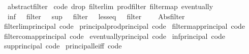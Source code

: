 \begin{isabellebody}
\isamarkupfalse%
\ {\isacharparenleft}{\kern0pt}\ abstract{\isacharunderscore}{\kern0pt}filter\isanewline
\isanewline
{}\isamarkupfalse%
\ {\isacharbrackleft}{\kern0pt}{\isacharbrackleft}{\kern0pt}code\ drop{\isacharcolon}{\kern0pt}\ filterlim\ prod{\isacharunderscore}{\kern0pt}filter\ filtermap\ eventually\isanewline
\ \ {\isachardoublequoteopen}inf\ {\isacharcolon}{\kern0pt}{\isacharcolon}{\kern0pt}\ {\isacharunderscore}{\kern0pt}\ filter\ {\isasymRightarrow}\ {\isacharunderscore}{\kern0pt}{\isachardoublequoteclose}\ {\isachardoublequoteopen}sup\ {\isacharcolon}{\kern0pt}{\isacharcolon}{\kern0pt}\ {\isacharunderscore}{\kern0pt}\ filter\ {\isasymRightarrow}\ {\isacharunderscore}{\kern0pt}{\isachardoublequoteclose}\ {\isachardoublequoteopen}less{\isacharunderscore}{\kern0pt}eq\ {\isacharcolon}{\kern0pt}{\isacharcolon}{\kern0pt}\ {\isacharunderscore}{\kern0pt}\ filter\ {\isasymRightarrow}\ {\isacharunderscore}{\kern0pt}{\isachardoublequoteclose}\isanewline
\ \ Abs{\isacharunderscore}{\kern0pt}filter{\isacharbrackright}{\kern0pt}{\isacharbrackright}{\kern0pt}\isanewline
\isanewline
{}\isamarkupfalse%
\ filterlim{\isacharunderscore}{\kern0pt}principal\ {\isacharbrackleft}{\kern0pt}code{\isacharbrackright}{\kern0pt}\isanewline
{}\isamarkupfalse%
\ principal{\isacharunderscore}{\kern0pt}prod{\isacharunderscore}{\kern0pt}principal\ {\isacharbrackleft}{\kern0pt}code{\isacharbrackright}{\kern0pt}\isanewline
{}\isamarkupfalse%
\ filtermap{\isacharunderscore}{\kern0pt}principal\ {\isacharbrackleft}{\kern0pt}code{\isacharbrackright}{\kern0pt}\isanewline
{}\isamarkupfalse%
\ filtercomap{\isacharunderscore}{\kern0pt}principal\ {\isacharbrackleft}{\kern0pt}code{\isacharbrackright}{\kern0pt}\isanewline
{}\isamarkupfalse%
\ eventually{\isacharunderscore}{\kern0pt}principal\ {\isacharbrackleft}{\kern0pt}code{\isacharbrackright}{\kern0pt}\isanewline
{}\isamarkupfalse%
\ inf{\isacharunderscore}{\kern0pt}principal\ {\isacharbrackleft}{\kern0pt}code{\isacharbrackright}{\kern0pt}\isanewline
{}\isamarkupfalse%
\ sup{\isacharunderscore}{\kern0pt}principal\ {\isacharbrackleft}{\kern0pt}code{\isacharbrackright}{\kern0pt}\isanewline
{}\isamarkupfalse%
\ principal{\isacharunderscore}{\kern0pt}le{\isacharunderscore}{\kern0pt}iff\ {\isacharbrackleft}{\kern0pt}code{\isacharbrackright}{\kern0pt}\isanewline
\isanewline
{}\isamarkupfalse%

\end{isabellebody}

